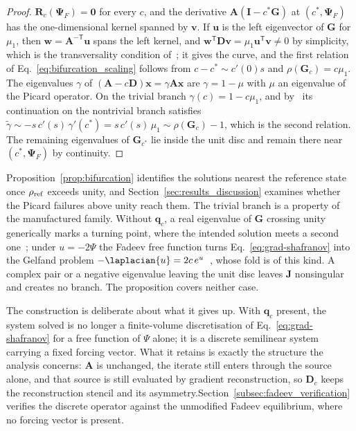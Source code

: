 \begin{proof}
$\mathbf{R}_c(\bm{\Psi}_F)=\mathbf{0}$ for every $c$, and the derivative $\mathbf{A}(\mathbf{I}-c^{\ast}\mathbf{G})$ at $(c^{\ast},\bm{\Psi}_F)$ has the one-dimensional kernel spanned by $\mathbf{v}$. If $\mathbf{u}$ is the left eigenvector of $\mathbf{G}$ for $\mu_{1}$, then $\mathbf{w}=\mathbf{A}^{-\mathsf{T}}\mathbf{u}$ spans the left kernel, and $\mathbf{w}^{\mathsf{T}}\mathbf{D}\mathbf{v}=\mu_{1}\mathbf{u}^{\mathsf{T}}\mathbf{v}\neq0$ by simplicity, which is the transversality condition of~\cite[Theorem~1.7]{Crandall1971BifurcationEigenvalues}; it gives the curve, and the first relation of Eq.~\eqref{eq:bifurcation_scaling} follows from $c-c^{\ast}\sim c'(0)s$ and $\rho(\mathbf{G}_c)=c\mu_{1}$. The eigenvalues $\gamma$ of $(\mathbf{A}-c\mathbf{D})\mathbf{x}=\gamma\mathbf{A}\mathbf{x}$ are $\gamma=1-\mu$ with $\mu$ an eigenvalue of the Picard operator. On the trivial branch $\gamma(c)=1-c\mu_{1}$, and by~\cite[Theorem~1.16]{Crandall1973BifurcationStability} its continuation on the nontrivial branch satisfies $\tilde{\gamma}\sim -s\,c'(s)\,\gamma'(c^{\ast})=s\,c'(s)\,\mu_{1}\sim\rho(\mathbf{G}_c)-1$, which is the second relation. The remaining eigenvalues of $\mathbf{G}_{c^{\ast}}$ lie inside the unit disc and remain there near $(c^{\ast},\bm{\Psi}_F)$ by continuity.
\end{proof}

Proposition~\ref{prop:bifurcation} identifies the solutions nearest the reference state once $\rho_{\rm ref}$ exceeds unity, and Section~\ref{sec:results_discussion} examines whether the Picard failures above unity reach them. The trivial branch is a property of the manufactured family. Without $\mathbf{q}_c$, a real eigenvalue of $\mathbf{G}$ crossing unity generically marks a turning point, where the intended solution meets a second one~\cite{Rabinowitz1977ApplicationsSeminar}; under $u=-2\Psi$ the Fadeev free function turns Eq.~\eqref{eq:grad-shafranov} into the Gelfand problem $-\laplacian{u}=2c\,e^{u}$~\cite{Gelfand1963SomeEquations}, whose fold is of this kind. A complex pair or a negative eigenvalue leaving the unit disc leaves $\mathbf{J}$ nonsingular and creates no branch. The proposition covers neither case. 

The construction is deliberate about what it gives up. With $\mathbf{q}_c$ present, the system solved is no longer a finite-volume discretisation of Eq.~\eqref{eq:grad-shafranov} for a free function of $\Psi$ alone; it is a discrete semilinear system carrying a fixed forcing vector. What it retains is exactly the structure the analysis concerns: $\mathbf{A}$ is unchanged, the iterate still enters through the source alone, and that source is still evaluated by gradient reconstruction, so $\mathbf{D}_c$ keeps the reconstruction stencil and its asymmetry.Section~\ref{subsec:fadeev_verification} verifies the discrete operator against the unmodified Fadeev equilibrium, where no forcing vector is present.

